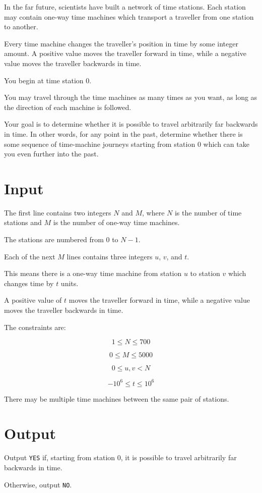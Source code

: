 
In the far future, scientists have built a network of time stations.
Each station may contain one-way time machines which transport a traveller
from one station to another.

Every time machine changes the traveller's position in time by some integer
amount. A positive value moves the traveller forward in time, while a negative
value moves the traveller backwards in time.

You begin at time station 0.

You may travel through the time machines as many times as you want, as long as
the direction of each machine is followed.

Your goal is to determine whether it is possible to travel arbitrarily far
backwards in time. In other words, for any point in the past, determine whether
there is some sequence of time-machine journeys starting from station 0 which
can take you even further into the past.

\section*{Input}

The first line contains two integers $N$ and $M$, where $N$ is the number of
time stations and $M$ is the number of one-way time machines.

The stations are numbered from $0$ to $N-1$.

Each of the next $M$ lines contains three integers $u$, $v$, and $t$.

This means there is a one-way time machine from station $u$ to station $v$
which changes time by $t$ units.

A positive value of $t$ moves the traveller forward in time, while a negative
value moves the traveller backwards in time.

The constraints are:

\[
1 \le N \le 700
\]

\[
0 \le M \le 5000
\]

\[
0 \le u,v < N
\]

\[
-10^6 \le t \le 10^6
\]

There may be multiple time machines between the same pair of stations.

\section*{Output}

Output \texttt{YES} if, starting from station 0, it is possible to travel
arbitrarily far backwards in time.

Otherwise, output \texttt{NO}.
